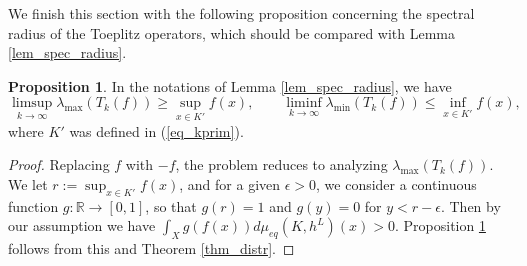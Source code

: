 \documentclass[12pt]{article}
\numberwithin{equation}{section}
\theoremstyle{theorem}
\theoremstyle{definition}
\newtheorem{prop}[thm]{Proposition}
\theoremstyle{remark}
\newcommand{\real}{\mathbb{R}}
\begin{document}
	We finish this section with the following proposition concerning the spectral radius of the Toeplitz operators, which should be compared with Lemma \ref{lem_spec_radius}.
	\begin{prop}\label{prop_spec_radius}
		In the notations of Lemma \ref{lem_spec_radius}, we have
		\begin{equation}
			\limsup_{k \to \infty} \lambda_{\max}(T_k(f)) \geq \sup_{x \in K'} f(x),
			\qquad
			\liminf_{k \to \infty} \lambda_{\min}(T_k(f)) \leq \inf_{x \in K'} f(x),
		\end{equation}
		where $K'$ was defined in (\ref{eq_kprim}).
	\end{prop}
	\begin{sloppypar}
	\begin{proof}
		Replacing $f$ with $-f$, the problem reduces to analyzing $\lambda_{\max}(T_k(f))$.
		We let $r := \sup_{x \in K'} f(x)$, and for a given $\epsilon > 0$, we consider a continuous function $g: \real \to [0, 1]$, so that $g(r) = 1$ and $g(y) = 0$ for $y < r - \epsilon$.
		Then by our assumption we have $\int_X g(f(x)) d \mu_{eq}(K, h^L)(x) > 0$. 
		Proposition \ref{prop_spec_radius} follows from this and Theorem \ref{thm_distr}.
	\end{proof}
	\end{sloppypar}
	
\end{document}
